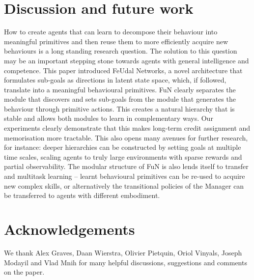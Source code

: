 \section{Discussion and future work}
\label{sec:conclusion}
\seckiny

How to create agents that can learn to decompose their behaviour into meaningful primitives and then reuse them to more efficiently acquire new behaviours is a long standing research question. 
%
The solution to this question may be an important stepping stone towards agents with general intelligence and competence. %
This paper introduced FeUdal Networks, a novel architecture that formulates sub-goals as directions in latent state space, which, if followed, translate into a meaningful behavioural primitives. 
%
FuN clearly separates the module that discovers and sets sub-goals from the module that generates the behaviour through primitive actions. This creates a natural hierarchy that is stable and allows both modules to learn in complementary ways. 
%
Our experiments clearly demonstrate that this makes long-term credit assignment and memorisation more tractable. 
%
This also opens many avenues for further research, for instance: deeper hierarchies can be constructed by setting goals at multiple time scales, scaling agents to truly large environments with sparse rewards and partial observability.
%
The modular structure of FuN is also lends itself to transfer and multitask learning -- learnt behavioural primitives can be re-used to acquire new complex skills, or alternatively the transitional policies of the Manager can be transferred to agents with different embodiment.  

\section{Acknowledgements}
We thank Alex Graves, Daan Wierstra, Olivier Pietquin, Oriol Vinyals, Joseph Modayil and Vlad Mnih for many helpful
discussions, suggestions and comments on the paper.